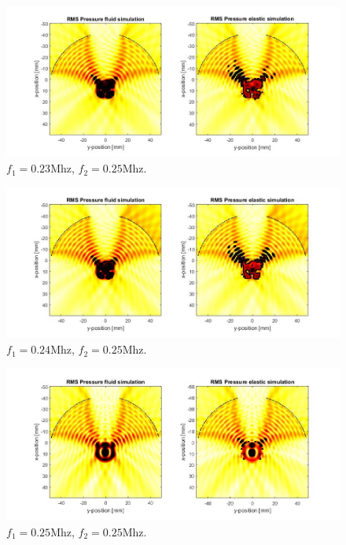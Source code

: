 \documentclass[10pt,a4paper]{article}
\begin{document}
\begin{figure}[H]
\hspace*{-4cm}                                                    
\includegraphics[scale=0.6]{comp_230kHz}
\caption{$f_1  = 0.23$Mhz, $f_2 = 0.25$Mhz.}
\label{comp_230kHz}
\end{figure}
\begin{figure}[H]
\hspace*{-4cm}                                                    
\includegraphics[scale=0.6]{comp_240kHz}
\caption{$f_1  = 0.24$Mhz, $f_2 = 0.25$Mhz.}
\label{comp_240kHz}
\end{figure}
\begin{figure}[H]
\hspace*{-4cm}                                                    
\includegraphics[scale=0.6]{comp_250kHz}
\caption{$f_1  = 0.25$Mhz, $f_2 = 0.25$Mhz.}
\label{comp_250kHz}
\end{figure}
\end{document}
